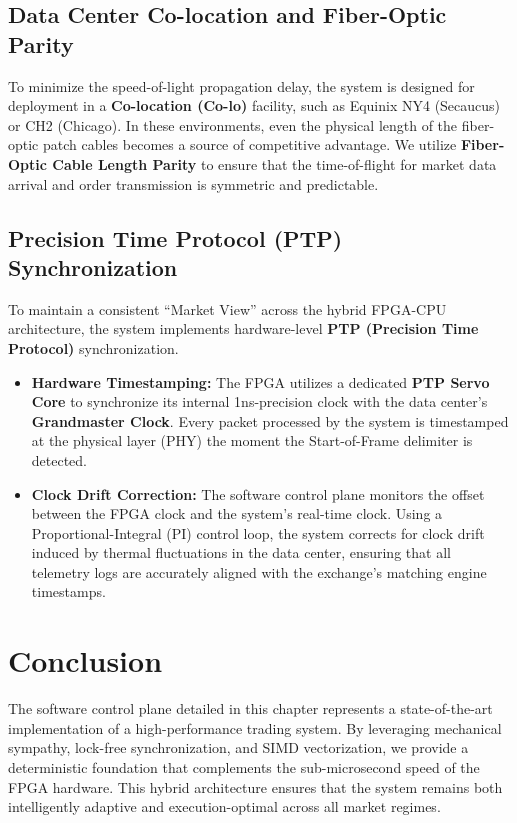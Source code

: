 \subsection{Data Center Co-location and Fiber-Optic Parity}
To minimize the speed-of-light propagation delay, the system is designed for deployment in a \textbf{Co-location (Co-lo)} facility, such as Equinix NY4 (Secaucus) or CH2 (Chicago). In these environments, even the physical length of the fiber-optic patch cables becomes a source of competitive advantage. We utilize \textbf{Fiber-Optic Cable Length Parity} to ensure that the time-of-flight for market data arrival and order transmission is symmetric and predictable.

\subsection{Precision Time Protocol (PTP) Synchronization}
To maintain a consistent ``Market View'' across the hybrid FPGA-CPU architecture, the system implements hardware-level \textbf{PTP (Precision Time Protocol)} synchronization.
\begin{itemize}
    \item \textbf{Hardware Timestamping:} The FPGA utilizes a dedicated \textbf{PTP Servo Core} to synchronize its internal 1ns-precision clock with the data center's \textbf{Grandmaster Clock}. Every packet processed by the system is timestamped at the physical layer (PHY) the moment the Start-of-Frame delimiter is detected.
    \item \textbf{Clock Drift Correction:} The software control plane monitors the offset between the FPGA clock and the system's real-time clock. Using a Proportional-Integral (PI) control loop, the system corrects for clock drift induced by thermal fluctuations in the data center, ensuring that all telemetry logs are accurately aligned with the exchange's matching engine timestamps.
\end{itemize}

\section{Conclusion}
The software control plane detailed in this chapter represents a state-of-the-art implementation of a high-performance trading system. By leveraging mechanical sympathy, lock-free synchronization, and SIMD vectorization, we provide a deterministic foundation that complements the sub-microsecond speed of the FPGA hardware. This hybrid architecture ensures that the system remains both intelligently adaptive and execution-optimal across all market regimes.

